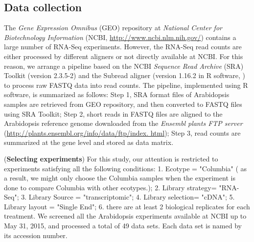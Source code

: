 \documentclass[11pt, a4paper]{article}
\begin{document}
\subsection{Data collection}\label{section:DataCollection}
The \textit{Gene Expression Omnibus} (GEO) repository at \textit{National Center for Biotechnology Information} (NCBI, \url{http://www.ncbi.nlm.nih.gov/}) contains a large number of RNA-Seq experiments. However, the RNA-Seq read counts are either processed by different aligners or not directly available at NCBI. For this reason, we arrange a pipeline based on the NCBI \textit{Sequence Read Archive} (SRA) Toolkit (version 2.3.5-2) and the Subread aligner (version 1.16.2 in R software, \cite{liao2013subread}) to process raw FASTQ data into read counts. The pipeline, implemented using R software, is summarized as follows: Step 1,  SRA format files of Arabidopsis samples are retrieved from GEO repository, and then converted to FASTQ files using SRA Toolkit;  %
Step 2, short reads in FASTQ files are aligned to the Arabidopsis reference genome downloaded from the\textit{ Ensembl plants FTP server} (\url{http://plants.ensembl.org/info/data/ftp/index. html});
Step 3, read counts are summarized at the gene level
 and stored as data matrix. %


  (\textbf{Selecting experiments}) For this study, our attention is restricted to experiments satisfying all the following conditions:  1. Ecotype = "Columbia" ( as a result, we might only choose the Columbia samples when the experiment is done to compare Columbia with other ecotypes.); 2. Library strategy= "RNA-Seq"; 3. Library Source = "transcriptomic"; 4. Library selection= "cDNA"; 5. Library layout = "Single End"; 6. there are at least 2 biological replicates for each treatment. We screened all the Arabidopsis experiments available at NCBI up to May 31, 2015, and processed a total of 49 data sets. Each data set is named by its accession number. 
    
\end{document}
